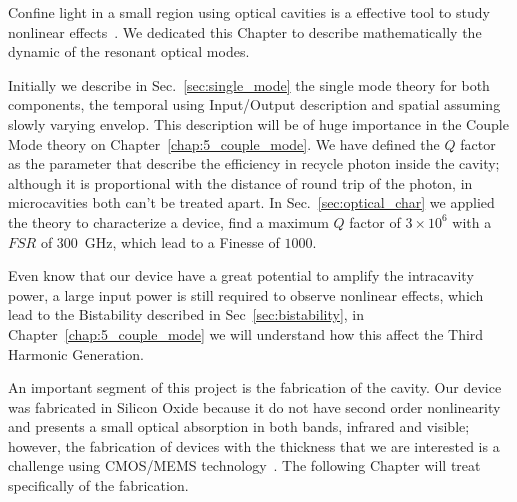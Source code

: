 Confine light in a small region using optical cavities is a effective tool to study nonlinear effects~\cite{Li18}. We dedicated this Chapter to describe mathematically the dynamic of the resonant optical modes.

Initially we describe in Sec.~\ref{sec:single_mode} the single mode theory for both  components, the temporal using Input/Output description and spatial assuming slowly varying envelop. This description will be of huge importance in the Couple Mode theory on Chapter~\ref{chap:5_couple_mode}. We have defined the $Q$ factor as the parameter that describe the efficiency in recycle photon inside the cavity; although it is proportional with the distance of round trip of the photon, in microcavities both can't be treated apart. In Sec.~\ref{sec:optical_char} we applied the theory to characterize a device, find a maximum $Q$ factor of $3\times10^6$ with a $FSR$ of $300$~GHz, which lead to a Finesse of $1000$. 

Even know that our device have a great potential to amplify the intracavity power, a large input power is still required to observe nonlinear effects, which lead to the Bistability described in  Sec~\ref{sec:bistability}, in Chapter~\ref{chap:5_couple_mode} we will understand how this affect the Third Harmonic Generation.

An important segment of this project is the fabrication of the cavity. Our device was fabricated in Silicon Oxide because it do not have second order nonlinearity and presents a small optical absorption in both bands, infrared and visible; however, the fabrication of devices with the thickness that we are interested is a challenge using CMOS/MEMS technology~\cite{Qu16, Liu15}. The following Chapter will treat specifically of the fabrication. 